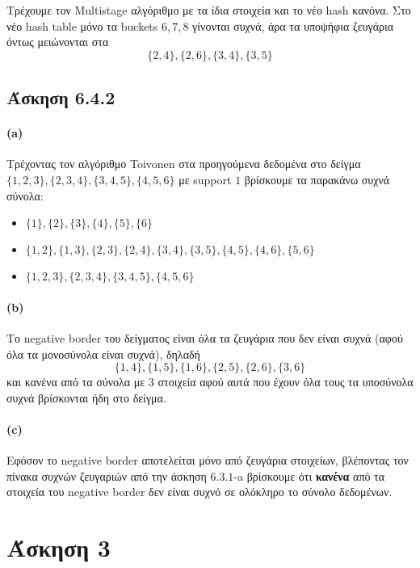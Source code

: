 \documentclass[a4paper,11pt]{article}
\begin{document}
Τρέχουμε τον Multistage αλγόριθμο με τα ίδια στοιχεία και το νέο hash κανόνα.
Στο νέο hash table μόνο τα buckets $6,7,8$ γίνονται συχνά, άρα τα υποψήφια ζευγάρια όντως μειώνονται στα
\[\{2,4\},\{2,6\},\{3,4\},\{3,5\}\]


\subsection*{Άσκηση 6.4.2}

\paragraph{(a)} Τρέχοντας τον αλγόριθμο Toivonen στα προηγούμενα δεδομένα στο δείγμα\\ $\{1,2,3\},\{2,3,4\},\{3,4,5\},\{4,5,6\}$ με support $1$ βρίσκουμε τα παρακάνω συχνά σύνολα:
\begin{itemize}
	\item $\{1\},\{2\},\{3\},\{4\},\{5\},\{6\}$
	\item $\{1,2\},\{1,3\},\{2,3\},\{2,4\},\{3,4\},\{3,5\},\{4,5\},\{4,6\},\{5,6\}$
	\item $\{1,2,3\},\{2,3,4\},\{3,4,5\},\{4,5,6\}$
\end{itemize}

\paragraph{(b)} Το negative border του δείγματος είναι όλα τα ζευγάρια που δεν είναι συχνά (αφού όλα τα μονοσύνολα είναι συχνά), δηλαδή
\[\{1,4\},\{1,5\},\{1,6\},\{2,5\},\{2,6\},\{3,6\}\]
και κανένα από τα σύνολα με $3$ στοιχεία αφού αυτά που έχουν όλα τους τα υποσύνολα συχνά βρίσκονται ήδη στο δείγμα.

\paragraph{(c)} Εφόσον το negative border αποτελείται μόνο από ζευγάρια στοιχείων, βλέποντας τον πίνακα συχνών ζευγαριών από την άσκηση $6.3.1$-a βρίσκουμε ότι \textbf{κανένα} από τα στοιχεία του negative border δεν είναι συχνό σε ολόκληρο το σύνολο δεδομένων.




\section*{Άσκηση 3}
\end{document}
